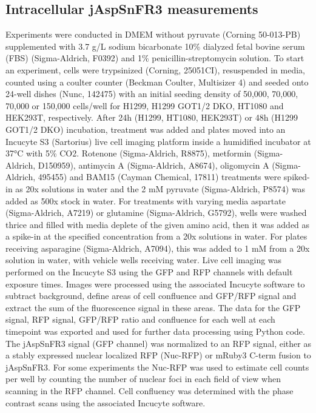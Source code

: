 \subsection{Intracellular jAspSnFR3 measurements}
Experiments were conducted in DMEM without pyruvate (Corning 50-013-PB) supplemented with 3.7 g/L sodium bicarbonate 10\% dialyzed fetal bovine serum (FBS) (Sigma-Aldrich, F0392) and 1\% penicillin-streptomycin solution.
To start an experiment, cells were trypsinized (Corning, 25051CI), resuspended in media, counted using a coulter counter (Beckman Coulter, Multisizer 4) and seeded onto 24-well dishes (Nunc, 142475) with an initial seeding density of 50,000, 70,000, 70,000 or 150,000 cells/well for H1299, H1299 GOT1/2 DKO, HT1080 and HEK293T, respectively.
After 24h (H1299, HT1080, HEK293T) or 48h (H1299 GOT1/2 DKO) incubation, treatment was added and plates moved into an Incucyte S3 (Sartorius) live cell imaging platform inside a humidified incubator at 37°C with 5\% CO2.
Rotenone (Sigma-Aldrich, R8875), metformin (Sigma-Aldrich, D150959), antimycin A (Sigma-Aldrich, A8674), oligomycin A (Sigma-Aldrich, 495455) and BAM15 (Cayman Chemical, 17811) treatments were spiked-in as 20x solutions in water and the 2 mM pyruvate (Sigma-Aldrich, P8574) was added as 500x stock in water.
For treatments with varying media aspartate (Sigma-Aldrich, A7219) or glutamine (Sigma-Aldrich, G5792), wells were washed thrice and filled with media deplete of the given amino acid, then it was added as a spike-in at the specified concentration from a 20x solutions in water.
For plates receiving asparagine (Sigma-Aldrich, A7094), this was added to 1 mM from a 20x solution in water, with vehicle wells receiving water.
Live cell imaging was performed on the Incucyte S3 using the GFP and RFP channels with default exposure times.
Images were processed using the associated Incucyte software to subtract background, define areas of cell confluence and GFP/RFP signal and extract the sum of the fluorescence signal in these areas.
The data for the GFP signal, RFP signal, GFP/RFP ratio and confluence for each well at each timepoint was exported and used for further data processing using Python code.
The jAspSnFR3 signal (GFP channel) was normalized to an RFP signal, either as a stably expressed nuclear localized RFP (Nuc-RFP) or mRuby3 C-term fusion to jAspSnFR3.
For some experiments the Nuc-RFP was used to estimate cell counts per well by counting the number of nuclear foci in each field of view when scanning in the RFP channel.
Cell confluency was determined with the phase contrast scans using the associated Incucyte software.
